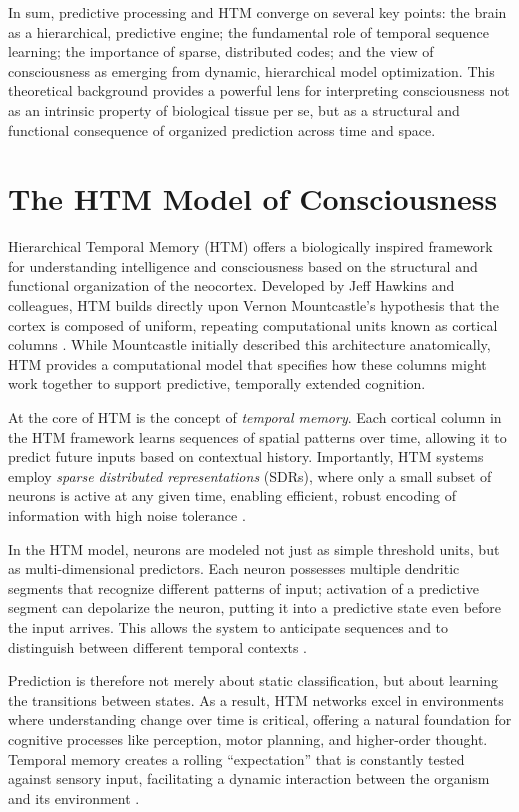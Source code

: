 \documentclass[12pt]{article}
\begin{document}
In sum, predictive processing and HTM converge on several key points: the brain as a hierarchical, predictive engine; the fundamental role of temporal sequence learning; the importance of sparse, distributed codes; and the view of consciousness as emerging from dynamic, hierarchical model optimization. This theoretical background provides a powerful lens for interpreting consciousness not as an intrinsic property of biological tissue per se, but as a structural and functional consequence of organized prediction across time and space.

\section{The HTM Model of Consciousness}

Hierarchical Temporal Memory (HTM) offers a biologically inspired framework for understanding intelligence and consciousness based on the structural and functional organization of the neocortex. Developed by Jeff Hawkins and colleagues, HTM builds directly upon Vernon Mountcastle’s hypothesis that the cortex is composed of uniform, repeating computational units known as cortical columns \cite{hawkins2004onintelligence,mountcastle1978mindfulbrain}. While Mountcastle initially described this architecture anatomically, HTM provides a computational model that specifies how these columns might work together to support predictive, temporally extended cognition.

At the core of HTM is the concept of \textit{temporal memory}. Each cortical column in the HTM framework learns sequences of spatial patterns over time, allowing it to predict future inputs based on contextual history. Importantly, HTM systems employ \textit{sparse distributed representations} (SDRs), where only a small subset of neurons is active at any given time, enabling efficient, robust encoding of information with high noise tolerance \cite{ahmad2015properties,hawkins2016neurons}.

In the HTM model, neurons are modeled not just as simple threshold units, but as multi-dimensional predictors. Each neuron possesses multiple dendritic segments that recognize different patterns of input; activation of a predictive segment can depolarize the neuron, putting it into a predictive state even before the input arrives. This allows the system to anticipate sequences and to distinguish between different temporal contexts \cite{hawkins2016neurons}.

Prediction is therefore not merely about static classification, but about learning the transitions between states. As a result, HTM networks excel in environments where understanding change over time is critical, offering a natural foundation for cognitive processes like perception, motor planning, and higher-order thought. Temporal memory creates a rolling ``expectation'' that is constantly tested against sensory input, facilitating a dynamic interaction between the organism and its environment \cite{hawkins2017thousand}.
\end{document}
